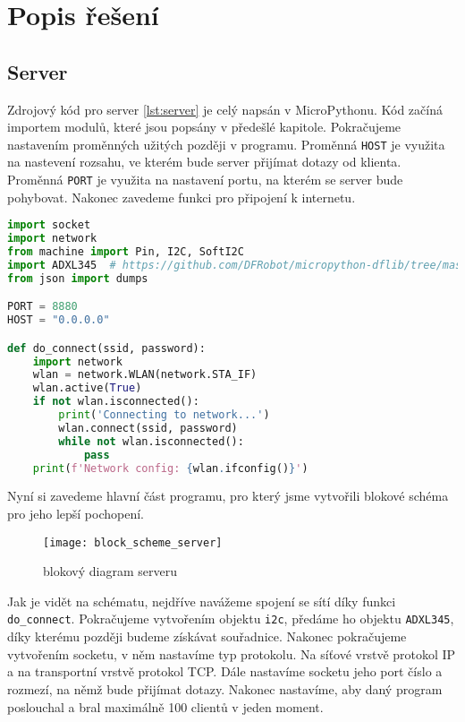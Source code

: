 \documentclass[12pt]{report}			%
\begin{document}
\section{Popis řešení}
\subsection{Server}
Zdrojový kód pro server \ref{lst:server} je celý napsán v MicroPythonu. Kód začíná importem modulů, které jsou popsány v předešlé kapitole. Pokračujeme nastavením proměnných užitých později v programu. Proměnná \texttt{HOST} je využita na nastevení rozsahu, ve kterém bude server přijímat dotazy od klienta. Proměnná \texttt{PORT} je využita na nastavení portu, na kterém se server bude pohybovat. Nakonec zavedeme funkci pro připojení k internetu.
\begin{lstlisting}[title={Program server.py}, caption={server.py}, language=Python]
import socket
import network
from machine import Pin, I2C, SoftI2C
import ADXL345  # https://github.com/DFRobot/micropython-dflib/tree/master/ADXL345
from json import dumps

PORT = 8880
HOST = "0.0.0.0"

def do_connect(ssid, password):
    import network
    wlan = network.WLAN(network.STA_IF)
    wlan.active(True)
    if not wlan.isconnected():
        print('Connecting to network...')
        wlan.connect(ssid, password)
        while not wlan.isconnected():
            pass
    print(f'Network config: {wlan.ifconfig()}')

\end{lstlisting}
Nyní si zavedeme hlavní část programu, pro který jsme vytvořili blokové schéma pro jeho lepší pochopení. 

\begin{figure}[h]
\caption{blokový diagram serveru}
\centering
 \texttt{[image: block\_scheme\_server]}
\end{figure}

Jak je vidět na schématu, nejdříve navážeme spojení se sítí díky funkci \texttt{do\_connect}. Pokračujeme vytvořením objektu \texttt{i2c}, předáme ho objektu \texttt{ADXL345}, díky kterému později budeme získávat souřadnice. Nakonec pokračujeme vytvořením socketu, v něm nastavíme typ protokolu. Na síťové vrstvě protokol IP a na transportní vrstvě protokol TCP. Dále nastavíme socketu jeho port číslo a rozmezí, na němž bude přijímat dotazy. Nakonec nastavíme, aby daný program poslouchal a bral maximálně 100 clientů v jeden moment. 
\end{document}
